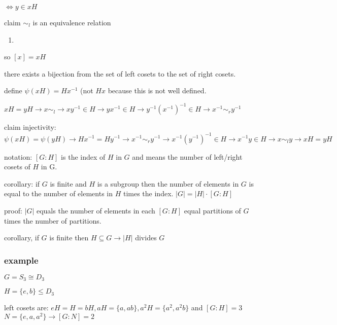 \documentclass[letterpaper]{article}
\begin{document}
$\Leftrightarrow y\in xH$

claim $\sim_l$ is an equivalence relation
\begin{enumerate}
\item

\end{enumerate}
so $[x]=xH$

there exists a bijection from the set of left cosets to the set of right cosets.

define $\psi(xH)=Hx^{-1}$ (not $Hx$ because this is not well defined.

$xH=yH\to x\sim_l\to xy^{-1}\in H\to yx^{-1}\in H\to y^{-1}(x^{-1})^{-1}\in H\to x^{-1}\sim_r y^{-1}$

claim injectivity:$\psi(xH)=\psi(yH)\to Hx^{-1}=Hy^{-1}\to x^{-1}\sim_ry^{-1}\to x^{-1}(y^{-1})^{-1}\in H\to x^{-1}y\in H\to x\sim_l y\to xH=yH$

notation:  $[G:H]$ is the index of $H$ in $G$ and means the number of left/right cosets of $H$ in G.

corollary: if $G$ is finite and $H$ is a subgroup then the number of elements in $G$ is equal to the number of elements in $H$ times the index. $|G|=|H|\cdot[G:H]$

proof: $|G|$ equals the number of elements in each $[G:H]$ equal partitions of $G$ times the number of partitions.

corollary, if $G$ is finite then $H\subseteq G\to |H|$ divides $G$

\subsubsection*{example}
$G=S_3\cong D_3$

$H=\{e,b\}\le D_3$

left cosets are: $eH=H=bH, aH=\{a,ab\}, a^2H=\{a^2,a^2b\}$ and $[G:H]=3$
$N=\{e,a,a^{2}\}\to [G:N]=2$
\end{document}
